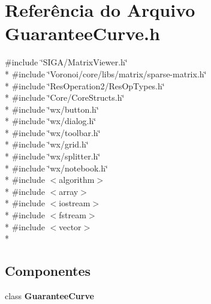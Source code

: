\section{Referência do Arquivo Guarantee\+Curve.\+h}
\label{_guarantee_curve_8h}
{\ttfamily \#include \char`\"{}S\+I\+G\+A/\+Matrix\+Viewer.\+h\char`\"{}}\\*
{\ttfamily \#include \char`\"{}Voronoi/core/libs/matrix/sparse-\/matrix.\+h\char`\"{}}\\*
{\ttfamily \#include \char`\"{}Res\+Operation2/\+Res\+Op\+Types.\+h\char`\"{}}\\*
{\ttfamily \#include \char`\"{}Core/\+Core\+Structs.\+h\char`\"{}}\\*
{\ttfamily \#include \char`\"{}wx/button.\+h\char`\"{}}\\*
{\ttfamily \#include \char`\"{}wx/dialog.\+h\char`\"{}}\\*
{\ttfamily \#include \char`\"{}wx/toolbar.\+h\char`\"{}}\\*
{\ttfamily \#include \char`\"{}wx/grid.\+h\char`\"{}}\\*
{\ttfamily \#include \char`\"{}wx/splitter.\+h\char`\"{}}\\*
{\ttfamily \#include \char`\"{}wx/notebook.\+h\char`\"{}}\\*
{\ttfamily \#include $<$algorithm$>$}\\*
{\ttfamily \#include $<$array$>$}\\*
{\ttfamily \#include $<$iostream$>$}\\*
{\ttfamily \#include $<$fstream$>$}\\*
{\ttfamily \#include $<$vector$>$}\\*
\subsection*{Componentes}
\begin{DoxyCompactItemize}
\item 
class {\bf Guarantee\+Curve}
\end{DoxyCompactItemize}
